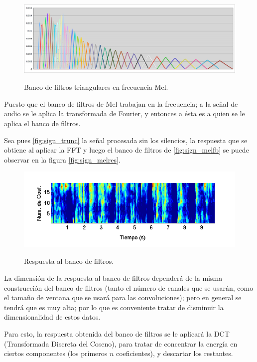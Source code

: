 \begin{figure}[bth]
  \myfloatalign
  {\includegraphics[width=0.9\linewidth]{gfx/chap5/melfb}} \quad
  \caption{Banco de filtros triangulares en frecuencia Mel.}
  \label{fig:sign_melfb}
\end{figure}

Puesto que el banco de filtros de Mel trabajan en la frecuencia; a la señal de audio se le aplica la transformada de Fourier, y entonces a ésta es a quien se le aplica el banco de filtros.

Sea pues \autoref{fig:sign_trunc} la señal procesada sin los silencios, la respuesta que se obtiene al aplicar la FFT y luego el banco de filtros de \autoref{fig:sign_melfb} se puede observar en la figura \autoref{fig:sign_melres}.
\begin{figure}[bth]
  \myfloatalign
  {\includegraphics[width=0.9\linewidth]{gfx/chap5/signal-mel}} \quad
  \caption{Respuesta al banco de filtros.}
  \label{fig:sign_melres}
\end{figure}

La dimensión de la respuesta al banco de filtros dependerá de la misma construcción del banco de filtros (tanto el número de canales que se usarán, como el tamaño de ventana que se usará para las convoluciones); pero en general se tendrá que es muy alta; por lo que es conveniente tratar de disminuir la dimensionalidad de estos datos.

Para esto, la respuesta obtenida del banco de filtros se le aplicará la DCT (Transformada Discreta del Coseno), para tratar de concentrar la energía en ciertos componentes (los primeros $n$ coeficientes), y descartar los restantes.

